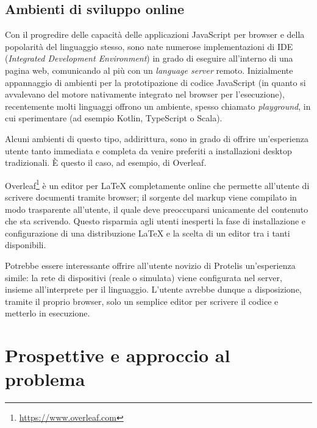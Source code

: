   \subsection{Ambienti di sviluppo online}\label{subsec:online-ide}

  Con il progredire delle capacità delle applicazioni JavaScript per browser e della popolarità del linguaggio stesso, sono nate numerose implementazioni di IDE (\emph{Integrated Development Environment}) in grado di eseguire all'interno di una pagina web, comunicando al più con un \emph{language server} remoto.
  Inizialmente appannaggio di ambienti per la prototipazione di codice JavaScript (in quanto si avvalevano del motore nativamente integrato nel browser per l'esecuzione), recentemente molti linguaggi offrono un ambiente, spesso chiamato \emph{playground}, in cui sperimentare (ad esempio Kotlin, TypeScript o Scala).

  Alcuni ambienti di questo tipo, addirittura, sono in grado di offrire un'esperienza utente tanto immediata e completa da venire preferiti a installazioni desktop tradizionali.
  È questo il caso, ad esempio, di Overleaf. 

  Overleaf\footnote{\url{https://www.overleaf.com}} è un editor per \LaTeX{} completamente online che permette all'utente di scrivere documenti tramite browser;
  il sorgente del markup viene compilato in modo trasparente all'utente, il quale deve preoccuparsi unicamente del contenuto che sta scrivendo.
  Questo risparmia agli utenti inesperti la fase di installazione e configurazione di una distribuzione \LaTeX{} e la scelta di un editor tra i tanti disponibili.

  Potrebbe essere interessante offrire all'utente novizio di Protelis un'esperienza simile:
  la rete di dispositivi (reale o simulata) viene configurata nel server, insieme all'interprete per il linguaggio.
  L'utente avrebbe dunque a disposizione, tramite il proprio browser, solo un semplice editor per scrivere il codice e metterlo in esecuzione.

  \section{Prospettive e approccio al problema}\label{sec:prospective}



